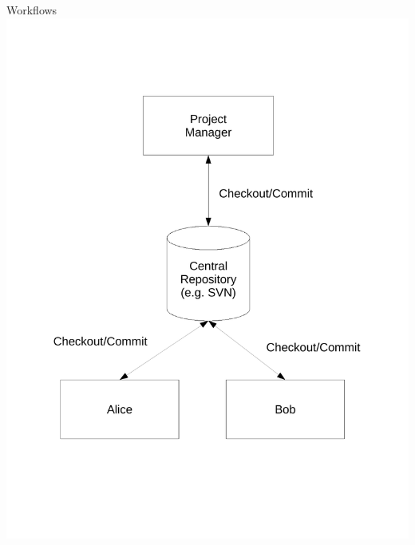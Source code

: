 \documentclass[final,hyperref={pdfpagelabels=false},notitlepage=true]{beamer}
\begin{document}
\begin{frame}{}
\begin{columns}[t]
\begin{column}{0.45\linewidth}
\vspace{1cm}
        \begin{block}{\large Workflows}
          \includegraphics[scale=0.90]{images/centralizedWorkflow.pdf}

\end{block}
\end{column}
\end{columns}
\end{frame}
\end{document}
